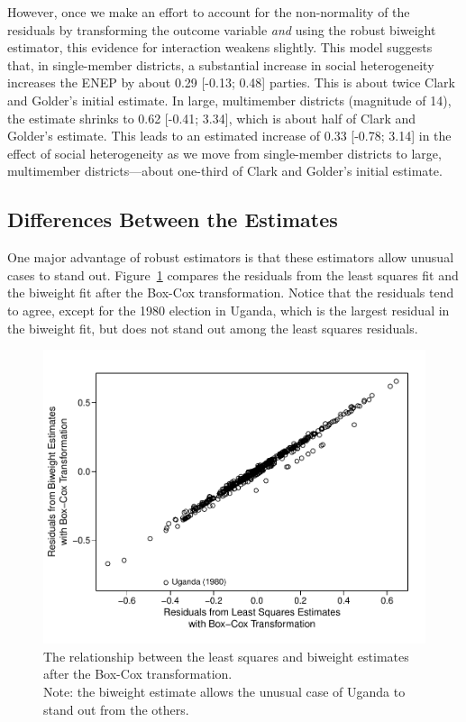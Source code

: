 \documentclass[12pt]{article}
\begin{document}
However, once we make an effort to account for the non-normality of the residuals by transforming the outcome variable \textit{and} using the robust biweight estimator, this evidence for interaction weakens slightly. 
This model suggests that, in single-member districts, a substantial increase in social heterogeneity increases the ENEP by about 0.29 [-0.13; 0.48] parties. 
This is about twice Clark and Golder's initial estimate.
In large, multimember districts (magnitude of 14), the estimate shrinks to 0.62 [-0.41; 3.34], which is about half of Clark and Golder's estimate. 
This leads to an estimated increase of 0.33 [-0.78; 3.14] in the effect of social heterogeneity as we move from single-member districts to large, multimember districts---about one-third of Clark and Golder's initial estimate.

\subsection*{Differences Between the Estimates}

One major advantage of robust estimators is that these estimators allow unusual cases to stand out. 
Figure~\ref{fig:cg-residuals-compare} compares the residuals from the least squares fit and the biweight fit after the Box-Cox transformation. 
Notice that the residuals tend to agree, except for the 1980 election in Uganda, which is the largest residual in the biweight fit, but does not stand out among the least squares residuals.

\begin{figure}[h!]
\begin{center}
\includegraphics[scale = 0.6]{figs/cg-residuals-compare.pdf}
\caption{The relationship between the least squares and biweight estimates after the Box-Cox transformation. \\
Note: the biweight estimate allows the unusual case of Uganda to stand out from the others.}\label{fig:cg-residuals-compare}
\end{center}
\end{figure}
\end{document}
